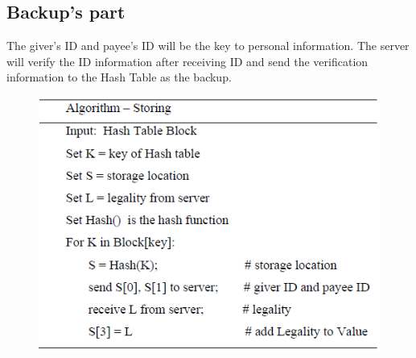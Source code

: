 \documentclass[conference]{IEEEtran}
\begin{document}
\subsection{Backup’s part}
The giver’s ID and payee’s ID will be the key to personal information. The server will verify the ID information after receiving ID and send the verification information to the Hash Table as the backup.
\begin{figure}[ht]	
	\centering
	\includegraphics[scale=0.4]{ALG_B.png}
\end{figure}
\end{document}
